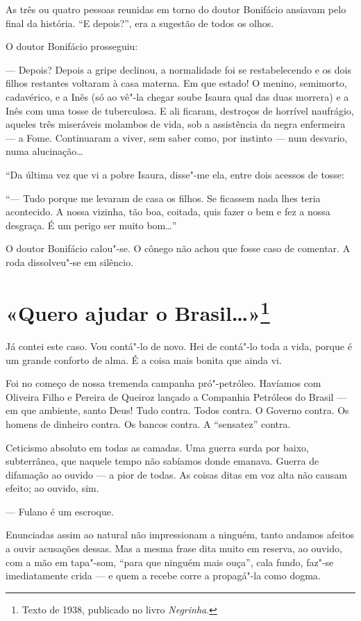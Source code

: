 As três ou quatro pessoas reunidas em torno do doutor Bonifácio ansiavam
pelo final da história. ``E depois?'', era a sugestão de todos os olhos.

O doutor Bonifácio prosseguiu:

--- Depois? Depois a gripe declinou, a normalidade foi se restabelecendo
e os dois filhos restantes voltaram à casa materna. Em que estado! O
menino, semimorto, cadavérico, e a Inês (só ao vê"-la chegar soube Isaura
qual das duas morrera) e a Inês com uma tosse de tuberculosa. E ali
ficaram, destroços de horrível naufrágio, aqueles três miseráveis
molambos de vida, sob a assistência da negra enfermeira --- a Fome.
Continuaram a viver, sem saber como, por instinto --- num desvario, numa
alucinação\ldots{}

``Da última vez que vi a pobre Isaura, disse"-me ela, entre dois acessos
de tosse:

``--- Tudo porque me levaram de casa os filhos. Se ficassem nada lhes
teria acontecido. A nossa vizinha, tão boa, coitada, quis fazer o bem e
fez a nossa desgraça. É um perigo ser muito bom\ldots{}''

O doutor Bonifácio calou"-se. O cônego não achou que fosse caso de
comentar. A roda dissolveu"-se em silêncio.

\chapter{«Quero ajudar o Brasil\ldots{}»\footnote[*]{Texto de 1938, publicado no livro \emph{Negrinha}.}}

Já contei este caso. Vou contá"-lo de novo. Hei de contá"-lo toda a vida,
porque é um grande conforto de alma. É a coisa mais bonita que ainda vi.

Foi no começo de nossa tremenda campanha pró"-petróleo. Havíamos com
Oliveira Filho e Pereira de Queiroz lançado a Companhia Petróleos do
Brasil --- em que ambiente, santo Deus! Tudo contra. Todos contra. O
Governo contra. Os homens de dinheiro contra. Os bancos contra. A
``sensatez'' contra.

Ceticismo absoluto em todas as camadas. Uma guerra surda por baixo,
subterrânea, que naquele tempo não sabíamos donde emanava. Guerra de
difamação ao ouvido --- a pior de todas. As coisas ditas em voz alta não
causam efeito; ao ouvido, sim.

--- Fulano é um escroque.

Enunciadas assim ao natural não impressionam a ninguém, tanto andamos
afeitos a ouvir acusações dessas. Mas a mesma frase dita muito em
reserva, ao ouvido, com a mão em tapa"-som, ``para que ninguém mais
ouça'', cala fundo, faz"-se imediatamente crida --- e quem a recebe corre
a propagá"-la como dogma.

